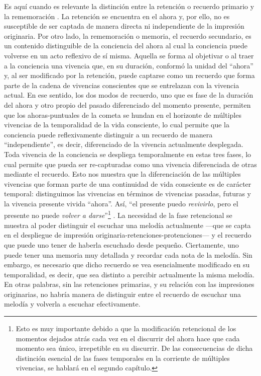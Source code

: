 Es aquí cuando es relevante la distinción entre la retención o recuerdo
primario y la rememoración \cite[§19, p.~67]{husserl2002}. La retención se
encuentra en el ahora y, por ello, no es susceptible de ser captada de
manera directa ni independiente de la impresión originaria. Por otro
lado, la rememoración o memoria, el recuerdo secundario, es un contenido
distinguible de la conciencia del ahora al cual la conciencia puede
volverse en un acto reflexivo de sí misma. Aquella se forma al objetivar
o al traer a la conciencia una vivencia que, en su duración, conformó la
unidad del ``ahora'' y, al ser modificado por la retención, puede
captarse como un recuerdo que forma parte de la cadena de vivencias
conscientes que se entrelazan con la vivencia actual. En ese sentido,
los dos modos de recuerdo, uno que es fase de la duración del ahora y
otro propio del pasado diferenciado del momento presente, permiten que
los ahoras-puntuales de la cometa se hundan en el horizonte de múltiples
vivencias de la temporalidad de la vida consciente, lo cual permite que
la conciencia puede reflexivamente distinguir a un recuerdo de manera
``independiente''\cite[§14, p.~58]{husserl2002}, es decir, diferenciado de la
vivencia actualmente desplegada. Toda vivencia de la conciencia se
despliega temporalmente en estas tres fases, lo cual permite que pueda
ser re-capturadas como una vivencia diferenciada de otras mediante el
recuerdo. Esto nos muestra que la diferenciación de las múltiples
vivencias que forman parte de una continuidad de vida consciente es de
carácter temporal: distinguimos las vivencias en términos de vivencias
pasadas, futuras y la vivencia presente vivida ``ahora''. Así, ``el
presente puedo \emph{revivirlo}, pero el presente no puede \emph{volver
a darse}''\footnote{Esto es muy importante debido a que la modificación
  retencional de los momentos dejados atrás cada vez en el discurrir del
  ahora hace que cada momento sea único, irrepetible en su discurrir. De
  las consecuencias de dicha distinción esencial de las fases temporales
  en la corriente de múltiples vivencias, se hablará en el segundo
  capítulo.} \cite[§18, p.~65]{husserl2002}. La necesidad de la fase
retencional se muestra al poder distinguir el escuchar una melodía
actualmente ---que se capta en el despliegue de impresión
originaria-retenciones-protenciones--- y el recuerdo que puede uno tener
de haberla escuchado desde pequeño. Ciertamente, uno puede tener una
memoria muy detallada y recordar cada nota de la melodía. Sin embargo,
es necesario que dicho recuerdo se vea esencialmente modificado en su
temporalidad, es decir, que sea distinto a percibir actualmente la misma
melodía. En otras palabras, sin las retenciones primarias, y su relación
con las impresiones originarias, no habría manera de distinguir entre el
recuerdo de escuchar una melodía y volverla a escuchar efectivamente.

